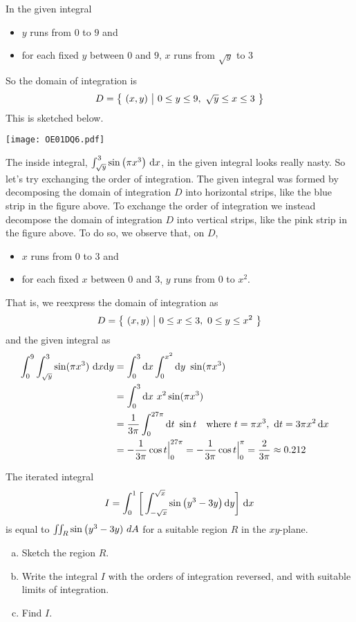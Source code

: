 \begin{solution}
In the given integral
\begin{itemize}
\item 
$y$ runs from $0$ to $9$ and
\item
for each fixed $y$ between $0$ and $9$, $x$ runs from $\sqrt{y}$ to $3$
\end{itemize}
So the domain of integration is 
\begin{equation*}
D = \big\{ \ (x,y)\ \big|\ 0\le y\le 9,\  \sqrt{y}\le x\le 3\ \big\}
\end{equation*}
This is sketched below. 
\begin{center}
     \texttt{[image: OE01DQ6.pdf]}
\end{center}
The inside integral, $\int_{\sqrt{y}}^3\sin\big(\pi x^3\big)\ \dee{x}$,
in the given integral looks really nasty.  So let's try exchanging
the order of integration. The given integral was formed by decomposing
the domain of integration $D$ into horizontal strips, like the blue strip
in the figure above. To exchange the order of integration we instead
decompose the domain of integration $D$ into vertical strips, 
like the pink strip in the figure above. To do so, we observe that, on $D$,
\begin{itemize}
\item 
$x$ runs from $0$ to $3$ and
\item
for each fixed $x$ between $0$ and $3$, $y$ runs from $0$ to $x^2$.
\end{itemize}
That is, we reexpress the domain of integration as 
\begin{equation*}
D = \big\{ \ (x,y)\ \big|\ 0\le x\le 3,\  0\le y\le x^2\ \big\}
\end{equation*}
and the given integral as
\begin{align*}
\int_0^9\int_{\sqrt{y}}^3\sin(\pi x^3)\ \mathrm{d}x\mathrm{d}y
&=\int_0^3\mathrm{d}x \int_0^{x^2}\mathrm{d}y\ \sin(\pi x^3) \cr
&=\int_0^3\mathrm{d}x \ x^2\sin(\pi x^3)\cr
&=\frac{1}{3\pi}\int_0^{27\pi}\mathrm{d}t\ \sin t\quad\hbox{where }
    t=\pi x^3,\ \mathrm{d}t=3\pi x^2\,\mathrm{d}x\cr
&=-\frac{1}{3\pi}\cos t\Big|_0^{27\pi}=-\frac{1}{3\pi}\cos t\Big|_0^\pi
=\frac{2}{3\pi}\approx 0.212
\end{align*}
\end{solution}

\begin{question}[M200 2000D] %
The iterated integral
\begin{equation*}
I=\int_0^1\bigg[\int_{-\sqrt{x}}^{\sqrt{x}} \sin\big(y^3-3y\big)\,\mathrm{d}y\bigg]
         \ \mathrm{d}x
\end{equation*}
is equal to $\iint_R\sin\big(y^3-3y)\ dA$ for a suitable region $R$ in
the $xy$-plane.
\begin{enumerate}[(a)]
\item
Sketch the region $R$.

\item 
Write the integral $I$ with the orders of integration reversed,
and with suitable limits of integration.

\item 
Find $I$.
\end{enumerate}
\end{question}

